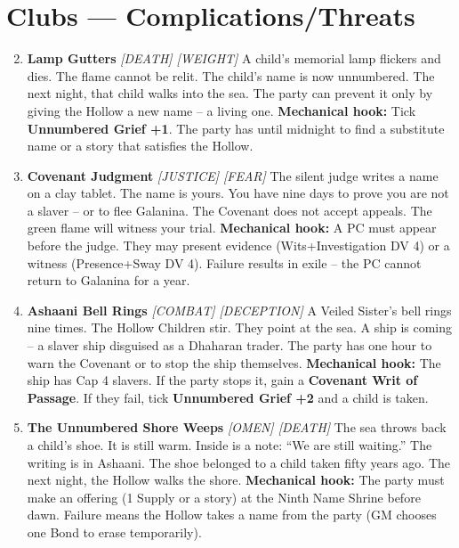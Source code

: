 \section*{Clubs --- Complications/Threats}
\label{sec:galanina-complications}
\begin{enumerate}
\setcounter{enumi}{1}
\item \textbf{Lamp Gutters} \hfill \textit{[DEATH] [WEIGHT]}  
  A child's memorial lamp flickers and dies. The flame cannot be relit. The child's name is now unnumbered. The next night, that child walks into the sea. The party can prevent it only by giving the Hollow a new name -- a living one.  
  \textbf{Mechanical hook:} Tick \textbf{Unnumbered Grief +1}. The party has until midnight to find a substitute name or a story that satisfies the Hollow.

\item \textbf{Covenant Judgment} \hfill \textit{[JUSTICE] [FEAR]}  
  The silent judge writes a name on a clay tablet. The name is yours. You have nine days to prove you are not a slaver -- or to flee Galanina. The Covenant does not accept appeals. The green flame will witness your trial.  
  \textbf{Mechanical hook:} A PC must appear before the judge. They may present evidence (Wits+Investigation DV 4) or a witness (Presence+Sway DV 4). Failure results in exile -- the PC cannot return to Galanina for a year.

\item \textbf{Ashaani Bell Rings} \hfill \textit{[COMBAT] [DECEPTION]}  
  A Veiled Sister's bell rings nine times. The Hollow Children stir. They point at the sea. A ship is coming -- a slaver ship disguised as a Dhaharan trader. The party has one hour to warn the Covenant or to stop the ship themselves.  
  \textbf{Mechanical hook:} The ship has Cap 4 slavers. If the party stops it, gain a \textbf{Covenant Writ of Passage}. If they fail, tick \textbf{Unnumbered Grief +2} and a child is taken.

\item \textbf{The Unnumbered Shore Weeps} \hfill \textit{[OMEN] [DEATH]}  
  The sea throws back a child's shoe. It is still warm. Inside is a note: ``We are still waiting.'' The writing is in Ashaani. The shoe belonged to a child taken fifty years ago. The next night, the Hollow walks the shore.  
  \textbf{Mechanical hook:} The party must make an offering (1 Supply or a story) at the Ninth Name Shrine before dawn. Failure means the Hollow takes a name from the party (GM chooses one Bond to erase temporarily).


\end{enumerate}
